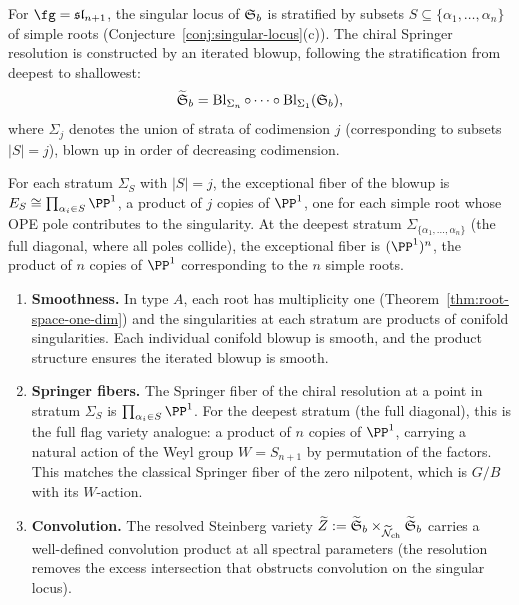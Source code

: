 \begin{construction}
\label{constr:springer-type-A}
For $\fg = \fsl_{n+1}$, the singular locus of $\mathfrak{S}_b$ is
stratified by subsets $S \subseteq \{\alpha_1, \ldots, \alpha_n\}$
of simple roots (Conjecture~\ref{conj:singular-locus}(c)).
The chiral Springer resolution is constructed by an iterated blowup,
following the stratification from deepest to shallowest:
\[
\widetilde{\mathfrak{S}}_b
= \operatorname{Bl}_{\Sigma_n} \circ \cdots \circ \operatorname{Bl}_{\Sigma_1}(\mathfrak{S}_b),
\]
where $\Sigma_j$ denotes the union of strata of codimension $j$
\textup{(}corresponding to subsets $|S| = j$\textup{)}, blown up in
order of decreasing codimension.

For each stratum $\Sigma_S$ with $|S| = j$, the exceptional fiber of
the blowup is
$E_S \cong \prod_{\alpha_i \in S} \PP^1$,
a product of $j$ copies of $\PP^1$, one for each simple root whose
OPE pole contributes to the singularity. At the deepest stratum
$\Sigma_{\{\alpha_1,\ldots,\alpha_n\}}$ \textup{(}the full diagonal,
where all poles collide\textup{)}, the exceptional fiber is
$(\PP^1)^n$, the product of $n$ copies of $\PP^1$ corresponding to
the $n$ simple roots.

\begin{enumerate}[label=\textup{(\alph*)}]
\item \textbf{Smoothness.}
 In type $A$, each root has multiplicity one
 (Theorem~\ref{thm:root-space-one-dim}) and the singularities at each
 stratum are products of conifold singularities. Each individual
 conifold blowup is smooth, and the product structure ensures the
 iterated blowup is smooth.

\item \textbf{Springer fibers.}
 The Springer fiber of the chiral resolution at a point in stratum
 $\Sigma_S$ is $\prod_{\alpha_i \in S} \PP^1$. For the deepest
 stratum (the full diagonal), this is the full flag variety
 analogue: a product of $n$ copies of $\PP^1$, carrying a natural
 action of the Weyl group $W = S_{n+1}$ by permutation of the
 factors. This matches the classical Springer fiber of the zero
 nilpotent, which is $G/B$ with its $W$-action.

\item \textbf{Convolution.}
 The resolved Steinberg variety
 $\widetilde{Z} := \widetilde{\mathfrak{S}}_b
 \times_{\widetilde{\mathcal{N}}_{\mathrm{ch}}}
 \widetilde{\mathfrak{S}}_b$
 carries a well-defined convolution product at all spectral
 parameters (the resolution removes the excess intersection that
 obstructs convolution on the singular locus).
\end{enumerate}
\end{construction}

